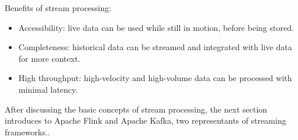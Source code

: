 


Benefits of stream processing:

\begin{itemize}
	\item Accessibility: live data can be used while still in motion, before being stored.
	\item Completeness: historical data can be streamed and integrated with live data for more context.
	\item High throughput: high-velocity and high-volume data can be processed with minimal latency.
\end{itemize}

After discussing the basic concepts of stream processing, the next section introduces to Apache Flink and
Apache Kafka, two representants of streaming frameworks..

